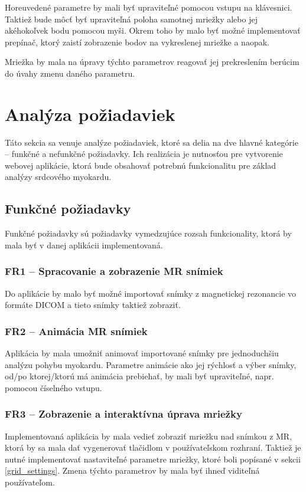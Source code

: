 Horeuvedené parametre by mali byť upraviteľné pomocou vstupu na klávesnici.
Taktiež bude môcť byť upraviteľná poloha samotnej mriežky alebo jej akéhokoľvek bodu pomocou myši. Okrem toho by malo byť možné implementovať prepínač, ktorý zaistí zobrazenie  bodov na vykreslenej mriežke a naopak.

Mriežka by mala na úpravy týchto parametrov reagovať jej prekreslením berúcim do úvahy zmenu daného parametru.

\section {Analýza požiadaviek}
Táto sekcia sa venuje analýze požiadaviek, ktoré sa delia na dve hlavné kategórie -- funkčné a nefunkčné požiadavky. Ich realizácia je nutnosťou pre vytvorenie webovej aplikácie, ktorá bude obsahovať potrebnú funkcionalitu pre základ analýzy srdcového myokardu.

\subsection {Funkčné požiadavky}
Funkčné požiadavky sú požiadavky vymedzujúce rozsah funkcionality, ktorá by mala byť v danej aplikácii implementovaná.

\subsubsection {FR1 -- Spracovanie a zobrazenie MR snímiek}\label{fr1}
Do aplikácie by malo byť možné importovať snímky z magnetickej rezonancie vo formáte DICOM a tieto snímky taktiež zobraziť.

\subsubsection {FR2 -- Animácia MR snímiek}\label{fr2}
Aplikácia by mala umožniť animovať importované snímky pre jednoduchšiu analýzu pohybu myokardu. Parametre animácie ako jej rýchlosť a výber snímky, od/po ktorej/ktorú má animácia prebiehať, by mali byť upraviteľné, napr. pomocou číselného vstupu.

\subsubsection {FR3 -- Zobrazenie a interaktívna úprava mriežky}\label{fr3}
Implementovaná aplikácia by mala vedieť zobraziť mriežku nad snímkou z MR, ktorá by sa mala dať vygenerovať tlačidlom v používateľskom rozhraní. Taktiež je nutné implementovať nastaviteľné parametre mriežky, ktoré boli popísané v sekcii \ref{grid_settings}. Zmena týchto parametrov by mala byť ihneď viditeľná používateľom.


